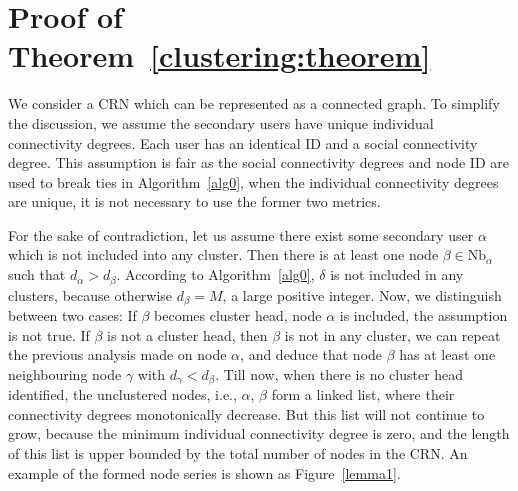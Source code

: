 \documentclass[10pt,journal,compsoc]{IEEEtran}
\makeatletter
\theoremstyle{mytheoremstyle}
\theoremstyle{mytheoremstyle}
\theoremstyle{mytheoremstyle}
\renewenvironment{proof}[1][\proofname]{%
      \par\pushQED{\qed}\fontfamily{ptm}\selectfont%
      \topsep6\p@\@plus6\p@\relax
      \trivlist\item[\hskip\labelsep\bfseries#1\@addpunct{.}]%
      \ignorespaces
    }{%
      \popQED\endtrivlist\@endpefalse
    }
\newcommand{\ie}{i.e., }
\makeatother
\begin{document}
\section*{Proof of Theorem~\ref{clustering:theorem}}
\label{proof_clustering:theorem}
\begin{proof}
We consider a CRN which can be represented as a connected graph.
To simplify the discussion, we assume the secondary users have unique individual connectivity degrees. 
Each user has an identical ID and a social connectivity degree.
This assumption is fair as the social connectivity degrees and node ID are used to break ties in Algorithm~\ref{alg0}, when the individual connectivity degrees are unique, it is not necessary to use the former two metrics. 

For the sake of contradiction, let us assume there exist some secondary user $\alpha$ which is not included into any cluster.
Then there is at least one node $\beta\in \text{Nb}_\alpha$ such that $d_{\alpha} > d_{\beta}$. 
According to Algorithm~\ref{alg0}, $\delta$ is not included in any clusters, because otherwise $d_{\beta} = M$, a large positive integer.
Now, we distinguish between two cases: 
If $\beta$ becomes cluster head, node $\alpha$ is included, the assumption is not true.
If $\beta$ is not a cluster head, then $\beta$ is not in any cluster, we can repeat the previous analysis made on node $\alpha$, and deduce that node $\beta$ has at least one neighbouring node $\gamma$ with $d_{\gamma} < d_{\beta}$.
Till now, when there is no cluster head identified, the unclustered nodes, \ie $\alpha$, $\beta$ form a linked list, where their connectivity degrees monotonically decrease.
But this list will not continue to grow, because the minimum individual connectivity degree is zero, and the length of this list is upper bounded by the total number of nodes in the CRN.
An example of the formed node series is shown as Figure~\ref{lemma1}.


\end{proof}
\end{document}
